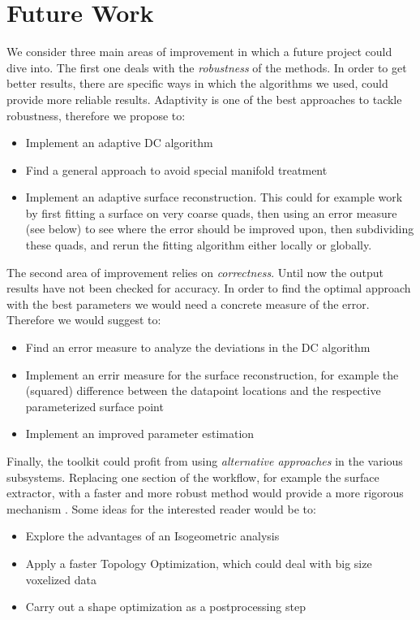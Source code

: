 \section{Future Work}
\label{sec:Future}
We consider three main areas of improvement in which a future project could dive into. The first one deals with the \textit{robustness} of the methods.  In order to get better results, there are specific ways in which the algorithms we used, could provide more reliable results. Adaptivity is one of the best approaches to tackle robustness, therefore we propose to:  
\begin{itemize}
\item Implement an adaptive DC algorithm
\item Find a general approach to  avoid special manifold treatment
\item Implement an adaptive surface reconstruction. This could for example work by first fitting a surface on very coarse quads, then using an error measure (see below) to see where the error should be improved upon, then subdividing these quads, and rerun the fitting algorithm either locally or globally.
\end{itemize}
The second area of improvement relies on \textit{correctness}. Until now the output results have not been checked for accuracy. In order to find the optimal approach with the best parameters we would need a concrete measure of the error. Therefore we would suggest to:
\begin{itemize}
\item Find an error measure to analyze the deviations in the DC algorithm
\item Implement an errir measure for the surface reconstruction, for example the (squared) difference between the datapoint locations and the respective parameterized surface point
\item Implement an improved parameter estimation %
\end{itemize}
Finally, the toolkit could profit from using \textit{alternative approaches} in the various subsystems. Replacing one section of the workflow, for example the surface extractor, with a faster and more robust method would provide a more rigorous mechanism . Some ideas for the interested reader would be to:
\begin{itemize}
\item Explore the advantages of an Isogeometric analysis

\item Apply a faster Topology Optimization, which could deal with big size voxelized data

\item Carry out a shape optimization as a postprocessing step
\end{itemize}
